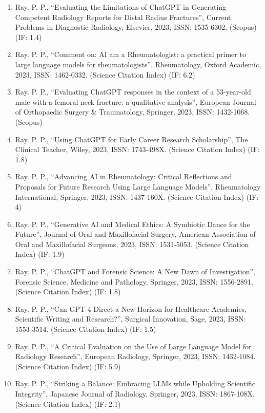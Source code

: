 \documentclass[11pt,a4paper]{moderncv}
\begin{document}
\begin{adjustwidth}{6em}{0pt}
\begin{enumerate}
		\item Ray. P. P., “Evaluating the Limitations of ChatGPT in Generating Competent Radiology Reports for Distal Radius Fractures”, Current Problems in Diagnostic Radiology, Elsevier, 2023, ISSN: 1535-6302. (Scopus) (IF: 1.4)
		\item Ray. P. P., “Comment on: AI am a Rheumatologist: a practical primer to large language models for rheumatologists”, Rheumatology, Oxford Academic, 2023, ISSN: 1462-0332. (Science Citation Index) (IF: 6.2)
		\item Ray. P. P., “Evaluating ChatGPT responses in the context of a 53-year-old male with a femoral neck fracture: a qualitative analysis”, European Journal of Orthopaedic Surgery \& Traumatology, Springer, 2023, ISSN: 1432-1068. (Scopus)
		\item Ray. P. P., “Using ChatGPT for Early Career Research Scholarship”, The Clinical Teacher, Wiley, 2023, ISSN: 1743-498X. (Science Citation Index) (IF: 1.8)
		\item Ray. P. P., “Advancing AI in Rheumatology: Critical Reflections and Proposals for Future Research Using Large Language Models”, Rheumatology International, Springer, 2023, ISSN: 1437-160X. (Science Citation Index) (IF: 4)
		\item Ray. P. P., “Generative AI and Medical Ethics: A Symbiotic Dance for the Future”, Journal of Oral and Maxillofacial Surgery, American Association of Oral and Maxillofacial Surgeons, 2023, ISSN: 1531-5053. (Science Citation Index) (IF: 1.9)
		\item Ray. P. P., “ChatGPT and Forensic Science: A New Dawn of Investigation”, Forensic Science, Medicine and Pathology, Springer, 2023, ISSN: 1556-2891. (Science Citation Index) (IF: 1.8)
		\item Ray. P. P., “Can GPT-4 Direct a New Horizon for Healthcare Academics, Scientific Writing and Research?”, Surgical Innovation, Sage, 2023, ISSN: 1553-3514. (Science Citation Index) (IF: 1.5)
		\item Ray. P. P., “A Critical Evaluation on the Use of Large Language Model for Radiology Research”, European Radiology, Springer, 2023, ISSN: 1432-1084. (Science Citation Index) (IF: 5.9)
		\item Ray. P. P., “Striking a Balance: Embracing LLMs while Upholding Scientific Integrity”, Japanese Journal of Radiology, Springer, 2023, ISSN: 1867-108X. (Science Citation Index) (IF: 2.1)
		

\end{enumerate}
\end{adjustwidth}
\end{document}
